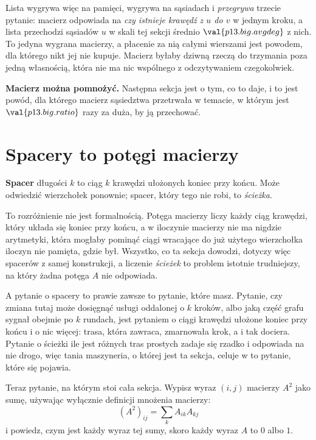 \begin{fr}
Lista wygrywa więc na pamięci, wygrywa na sąsiadach i \emph{przegrywa} trzecie
pytanie: macierz odpowiada na \emph{czy istnieje krawędź z $u$ do $v$} w jednym
kroku, a lista przechodzi sąsiadów $u$ \dash{} w skali tej sekcji średnio
$\val{p13.big.avgdeg}$ z nich. To jedyna wygrana macierzy, a płacenie za nią
całymi wierszami jest powodem, dla którego nikt jej nie kupuje. Macierz byłaby
dziwną rzeczą do trzymania \dash{} poza jedną własnością, która nie ma nic
wspólnego z odczytywaniem czegokolwiek.

\textbf{Macierz można pomnożyć.} Następna sekcja jest o tym, co to daje, i to
jest powód, dla którego macierz sąsiedztwa przetrwała w temacie, w którym jest
$\val{p13.big.ratio}$ razy za duża, by ją przechować.
\end{fr}

\section{Spacery to potęgi macierzy}
\label{sec:P13-walks}

\begin{fr}
\textbf{Spacer} długości $k$ to ciąg $k$ krawędzi ułożonych koniec przy końcu.
Może odwiedzić wierzchołek ponownie; spacer, który tego nie robi, to
\emph{ścieżka}.

To rozróżnienie nie jest formalnością. Potęga macierzy liczy każdy ciąg
krawędzi, który układa się koniec przy końcu, a w iloczynie macierzy nie ma
nigdzie arytmetyki, która mogłaby pominąć ciągi wracające do już użytego
wierzchołka \dash{} iloczyn nie pamięta, gdzie był. Wszystko, co ta sekcja
dowodzi, dotyczy więc spacerów z samej konstrukcji, a liczenie
\emph{ścieżek} to problem istotnie trudniejszy, na który żadna potęga $A$
nie odpowiada.

A pytanie o spacery to prawie zawsze to pytanie, które masz. Pytanie, czy
zmiana tutaj może dosięgnąć usługi oddalonej o $k$ kroków, albo jaką część
grafu sygnał obejmie po $k$ rundach, jest pytaniem o ciągi krawędzi ułożone
koniec przy końcu i o nic więcej: trasa, która zawraca, zmarnowała krok, a i
tak dociera. Pytanie o ścieżki \dash{} ile jest różnych tras prostych
\dash{} zadaje się rzadko i odpowiada na nie drogo, więc tania maszyneria,
o której jest ta sekcja, celuje w to pytanie, które się pojawia.

Teraz pytanie, na którym stoi cała sekcja. Wypisz wyraz $(i,j)$ macierzy
$A^{2}$ jako sumę, używając wyłącznie definicji mnożenia macierzy:
\[ (A^{2})_{ij} = \sum_{k} A_{ik}A_{kj} \]
i powiedz, czym jest każdy wyraz tej sumy, skoro każdy wyraz $A$ to $0$ albo
$1$.
\dotline
\nextframe
\end{fr}

